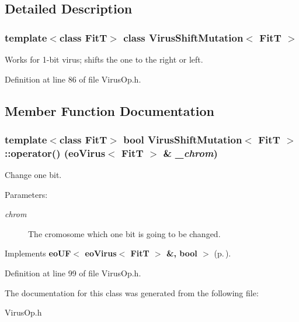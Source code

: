 \subsection{Detailed Description}
\subsubsection*{template$<$class Fit\-T$>$ class Virus\-Shift\-Mutation$<$ Fit\-T $>$}

Works for 1-bit virus; shifts the one to the right or left. 



Definition at line 86 of file Virus\-Op.h.

\subsection{Member Function Documentation}
\subsubsection{\setlength{\rightskip}{0pt plus 5cm}template$<$class Fit\-T$>$ bool {\bf Virus\-Shift\-Mutation}$<$ {\bf Fit\-T} $>$::operator() (eo\-Virus$<$ {\bf Fit\-T} $>$ \& {\em \_\-chrom})\hspace{0.3cm}{\tt  [inline, virtual]}}\label{class_virus_shift_mutation_a2}


Change one bit. 

\begin{Desc}
\item[Parameters:]
\begin{description}
\item[{\em chrom}]The cromosome which one bit is going to be changed. \end{description}
\end{Desc}


Implements {\bf eo\-UF$<$ eo\-Virus$<$ Fit\-T $>$ \&, bool $>$} {\rm (p.\,\pageref{classeo_u_f_a1})}.

Definition at line 99 of file Virus\-Op.h.

The documentation for this class was generated from the following file:\begin{CompactItemize}
\item 
Virus\-Op.h\end{CompactItemize}
